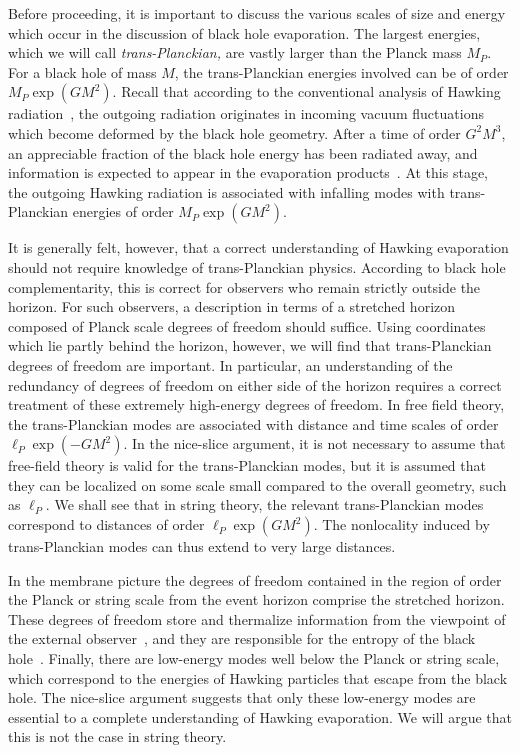 Before proceeding, it is important to discuss the various scales of
size and energy which occur in the discussion of black hole
evaporation.  The largest energies, which we will call {\it
trans-Planckian,} are vastly larger than the Planck mass $M_P$.  For
a black hole of mass $M$, the trans-Planckian energies involved can
be of order $M_P \exp (G M^2)$.  Recall that according to the
conventional analysis of Hawking radiation~, the
outgoing radiation originates in incoming vacuum fluctuations which
become deformed by the black hole geometry.  After a time of order
$G^2 M^3$, an appreciable fraction of the black hole energy has been
radiated away, and information is expected to appear in the
evaporation products~.  At this stage, the outgoing
Hawking radiation is associated with infalling modes with
trans-Planckian energies of order $M_P \exp (G M^2)$.

It is generally felt, however, that a correct understanding of
Hawking evaporation should not require knowledge of trans-Planckian
physics.  According to black hole complementarity, this is correct
for
observers who remain strictly outside the horizon.  For such
observers, a description in terms of a stretched horizon composed of
Planck scale degrees of freedom should suffice.  Using coordinates
which
lie partly behind the horizon, however, we will find that
trans-Planckian
degrees of freedom are important.  In particular, an understanding of
the redundancy of degrees of freedom on either side of the horizon
requires a correct treatment of these extremely high-energy degrees
of freedom.  In free field
theory, the trans-Planckian modes are associated with distance and
time scales of order $\ell_P \exp (-G M^2)$.  In the nice-slice
argument, it is not necessary to assume that free-field theory is
valid
for the trans-Planckian modes, but it is assumed that they can be
localized on some scale small compared to the overall geometry, such
as
$\ell_P$.  We shall see that in
string theory, the relevant trans-Planckian modes correspond to
distances of order $\ell_P \exp (G M^2)$.  The nonlocality induced
by trans-Planckian modes can thus extend to very large distances.

In the membrane picture the degrees of freedom contained in the
region of order the Planck or string scale from the event horizon
comprise the stretched horizon.  These degrees of freedom store and
thermalize information from the viewpoint of the external
observer~, and they are responsible for the
entropy of the black hole~.
Finally, there are low-energy modes well below the Planck or string
scale, which correspond to the energies of Hawking particles that
escape from the black hole.  The nice-slice argument suggests
that only these low-energy modes are
essential to a complete understanding of Hawking evaporation.
We will argue that this is not the case in string theory.

